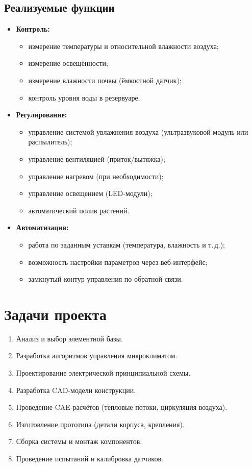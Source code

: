 \documentclass[a4paper,12pt]{article}
\begin{document}
\subsection*{Реализуемые функции}
\begin{itemize}
    \item \textbf{Контроль:}
    \begin{itemize}
        \item измерение температуры и относительной влажности воздуха;
        \item измерение освещённости;
        \item измерение влажности почвы (ёмкостной датчик);
        \item контроль уровня воды в резервуаре.
    \end{itemize}
    \item \textbf{Регулирование:}
    \begin{itemize}
        \item управление системой увлажнения воздуха (ультразвуковой модуль или распылитель);
        \item управление вентиляцией (приток/вытяжка);
        \item управление нагревом (при необходимости);
        \item управление освещением (LED-модули);
        \item автоматический полив растений.
    \end{itemize}
    \item \textbf{Автоматизация:}
    \begin{itemize}
        \item работа по заданным уставкам (температура, влажность и т.\,д.);
        \item возможность настройки параметров через веб-интерфейс;
        \item замкнутый контур управления по обратной связи.
    \end{itemize}
\end{itemize}

\section*{Задачи проекта}
\begin{enumerate}
    \item Анализ и выбор элементной базы.
    \item Разработка алгоритмов управления микроклиматом.
    \item Проектирование электрической принципиальной схемы.
    \item Разработка CAD-модели конструкции.
    \item Проведение CAE-расчётов (тепловые потоки, циркуляция воздуха).
    \item Изготовление прототипа (детали корпуса, крепления).
    \item Сборка системы и монтаж компонентов.
    \item Проведение испытаний и калибровка датчиков.
\end{enumerate}
\end{document}
